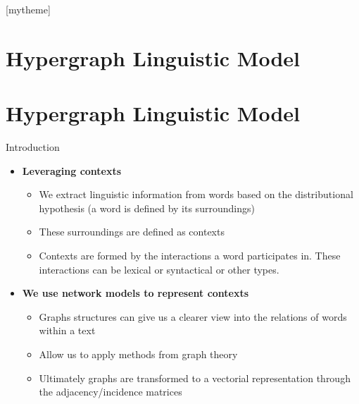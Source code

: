 \documentclass[10pt,=table]{beamer}
\begin{document}
[mytheme]

\section[Contributions in Detail]{Hypergraph Linguistic Model}
\section{Hypergraph Linguistic Model}
%


\begin{frame}{Introduction}


\begin{itemize}
	\item<1-> \textbf{Leveraging contexts}
	\begin{itemize}
	\item<1-> We extract linguistic information from words based on the \textcolor{orangeEric}{distributional hypothesis} (a word is defined by its surroundings)
	\item<1-> These surroundings are defined as contexts
	\item<1-> Contexts are formed by the interactions a word participates in. These interactions can be lexical or syntactical or other types.

	\end{itemize}
	\item<2-> \textbf{We use network models to represent contexts} 
		\begin{itemize}

		\item<2-> Graphs structures can give us a clearer view into the relations of words within a text 	
		\item<2-> Allow us to apply methods from graph theory
		\item<2-> Ultimately graphs are transformed to a vectorial representation through the adjacency/incidence matrices
		
		\end{itemize}
		
\end{itemize}
\vspace{\textheight}
\end{frame}
\end{document}
